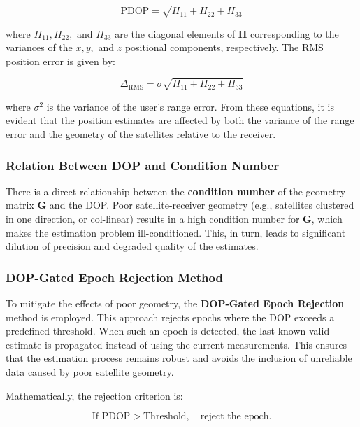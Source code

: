 \documentclass[conference]{IEEEtran}
\begin{document}
\begin{equation}
\text{PDOP} = \sqrt{H_{11} + H_{22} + H_{33}}
\end{equation}

where \( H_{11}, H_{22}, \) and \( H_{33} \) are the diagonal elements of \( \mathbf{H} \) corresponding to the variances of the \( x, y, \) and \( z \) positional components, respectively. The RMS position error is given by:

\begin{equation}
\Delta_{\text{RMS}} = \sigma \sqrt{H_{11} + H_{22} + H_{33}}
\end{equation}

where \( \sigma^2 \) is the variance of the user’s range error. From these equations, it is evident that the position estimates are affected by both the variance of the range error and the geometry of the satellites relative to the receiver.

\subsubsection*{Relation Between DOP and Condition Number}

There is a direct relationship between the \textbf{condition number} of the geometry matrix \( \mathbf{G} \) and the DOP. Poor satellite-receiver geometry (e.g., satellites clustered in one direction, or col-linear) results in a high condition number for \( \mathbf{G} \), which makes the estimation problem ill-conditioned. This, in turn, leads to significant dilution of precision and degraded quality of the estimates.

\subsubsection*{DOP-Gated Epoch Rejection Method}

To mitigate the effects of poor geometry, the \textbf{DOP-Gated Epoch Rejection} method is employed. This approach rejects epochs where the DOP exceeds a predefined threshold. When such an epoch is detected, the last known valid estimate is propagated instead of using the current measurements. This ensures that the estimation process remains robust and avoids the inclusion of unreliable data caused by poor satellite geometry.

Mathematically, the rejection criterion is:

\begin{equation}
\text{If } \text{PDOP} > \text{Threshold}, \quad \text{reject the epoch.}
\end{equation}
\end{document}
